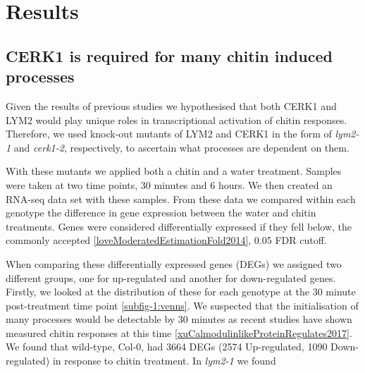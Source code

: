 \documentclass[../main.tex]{subfiles}
\begin{document}
\section{Results}

\subsection{CERK1 is required for many chitin induced processes}
 

Given the results of previous studies \cite{miyaCERK1LysMReceptor2007,Faulkner2013} we hypothesised that both CERK1 and LYM2 would play unique roles in transcriptional activation of chitin responses. Therefore, we used knock-out mutants of LYM2 and CERK1 in the form of \textit{lym2-1} and \textit{cerk1-2}, respectively, to ascertain what processes are dependent on them.

With these mutants we applied both a chitin and a water treatment. Samples were taken at two time points, 30 minutes and 6 hours. We then created an RNA-seq data set with these samples. From these data we compared within each genotype the difference in gene expression between the water and chitin treatments. Genes were considered differentially expressed if they fell below, the commonly accepted \ref{loveModeratedEstimationFold2014}, 0.05 FDR cutoff.  

When comparing these differentially expressed genes (DEGs) we assigned two different groups, one for up-regulated and another for down-regulated genes. Firstly, we looked at the distribution of these for each genotype at the 30 minute post-treatment time point \ref{subfig-1:venns}. We suspected that the initialisation of many processes would be detectable by 30 minutes as recent studies have shown measured chitin responses at this time \ref{xuCalmodulinlikeProteinRegulates2017}. We found that wild-type, Col-0, had 3664 DEGs (2574 Up-regulated, 1090 Down-regulated) in response to chitin treatment. In \textit{lym2-1} we found 


\end{document}
